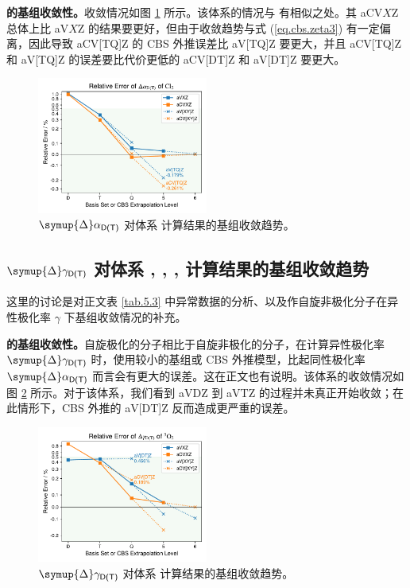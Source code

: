 \textbf{ 的基组收敛性。}收敛情况如图 \ref{fig.Cl2-iso} 所示。该体系的情况与  有相似之处。其 aCV$X$Z 总体上比 aV$X$Z 的结果要更好，但由于收敛趋势与式 (\ref{eq.cbs.zeta3}) 有一定偏离，因此导致 aCV[TQ]Z 的 CBS 外推误差比 aV[TQ]Z 要更大，并且 aCV[TQ]Z 和 aV[TQ]Z 的误差要比代价更低的 aCV[DT]Z 和 aV[DT]Z 要更大。

\begin{figure}[!ht]
    \centering
    \includegraphics[width=0.5\textwidth]{assets/Cl2-iso.pdf}
    \caption[$\symup{\Delta} \alpha_\textsf{D(T)}$ 对体系  计算结果的基组收敛趋势]{$\symup{\Delta} \alpha_\textsf{D(T)}$ 对体系  计算结果的基组收敛趋势。}
    \label{fig.Cl2-iso}
\end{figure}

\subsection{$\symup{\Delta} \gamma_\textsf{D(T)}$ 对体系 , , ,  计算结果的基组收敛趋势}
\label{sec.5.s5}

这里的讨论是对正文表 \ref{tab.5.3} 中异常数据的分析、以及作自旋非极化分子在异性极化率 $\gamma$ 下基组收敛情况的补充。

\textbf{ 的基组收敛性。}自旋极化的分子相比于自旋非极化的分子，在计算异性极化率 $\symup{\Delta} \gamma_\textsf{D(T)}$ 时，使用较小的基组或 CBS 外推模型，比起同性极化率 $\symup{\Delta} \alpha_\textsf{D(T)}$ 而言会有更大的误差。这在正文也有说明。该体系的收敛情况如图 \ref{fig.O2-aniso} 所示。对于该体系，我们看到 aVDZ 到 aVTZ 的过程并未真正开始收敛；在此情形下，CBS 外推的 aV[DT]Z 反而造成更严重的误差。

\begin{figure}[ht]
    \centering
    \includegraphics[width=0.5\textwidth]{assets/O2-aniso.pdf}
    \caption[$\symup{\Delta} \gamma_\textsf{D(T)}$ 对体系  计算结果的基组收敛趋势]{$\symup{\Delta} \gamma_\textsf{D(T)}$ 对体系  计算结果的基组收敛趋势。}
    \label{fig.O2-aniso}
\end{figure}

